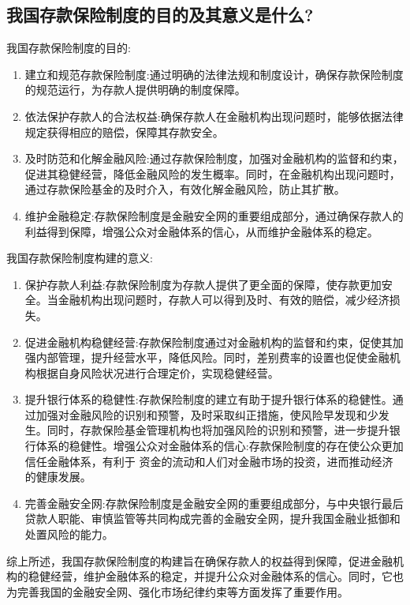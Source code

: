 \documentclass{article}
\begin{document}
\subsection{我国存款保险制度的目的及其意义是什么?}

\noindent 我国存款保险制度的目的:
\begin{enumerate}
	\item 建立和规范存款保险制度:通过明确的法律法规和制度设计，确保存款保险制度的规范运行，为存款人提供明确的制度保障。 
	\item 依法保护存款人的合法权益:确保存款人在金融机构出现问题时，能够依据法律规定获得相应的赔偿，保障其存款安全。 
	\item 及时防范和化解金融风险:通过存款保险制度，加强对金融机构的监督和约束，促进其稳健经营，降低金融风险的发生概率。同时，在金融机构出现问题时，通过存款保险基金的及时介入，有效化解金融风险，防止其扩散。
	\item 维护金融稳定:存款保险制度是金融安全网的重要组成部分，通过确保存款人的利益得到保障，增强公众对金融体系的信心，从而维护金融体系的稳定。 
\end{enumerate}

\noindent 我国存款保险制度构建的意义: 
\begin{enumerate}
	\item 保护存款人利益:存款保险制度为存款人提供了更全面的保障，使存款更加安全。当金融机构出现问题时，存款人可以得到及时、有效的赔偿，减少经济损失。 
	\item 促进金融机构稳健经营:存款保险制度通过对金融机构的监督和约束，促使其加强内部管理，提升经营水平，降低风险。同时，差别费率的设置也促使金融机构根据自身风险状况进行合理定价，实现稳健经营。 
	\item 提升银行体系的稳健性:存款保险制度的建立有助于提升银行体系的稳健性。通过加强对金融风险的识别和预警，及时采取纠正措施，使风险早发现和少发生。同时，存款保险基金管理机构也将加强风险的识别和预警，进一步提升银行体系的稳健性。增强公众对金融体系的信心:存款保险制度的存在使公众更加信任金融体系，有利于 资金的流动和人们对金融市场的投资，进而推动经济的健康发展。
	\item 完善金融安全网:存款保险制度是金融安全网的重要组成部分，与中央银行最后贷款人职能、审慎监管等共同构成完善的金融安全网，提升我国金融业抵御和处置风险的能力。 
\end{enumerate}

综上所述，我国存款保险制度的构建旨在确保存款人的权益得到保障，促进金融机构的稳健经营，维护金融体系的稳定，并提升公众对金融体系的信心。同时，它也为完善我国的金融安全网、强化市场纪律约束等方面发挥了重要作用。
\end{document}
